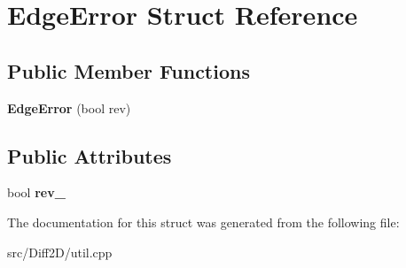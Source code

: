 \hypertarget{structEdgeError}{\section{Edge\-Error Struct Reference}
\label{structEdgeError}
}
\subsection*{Public Member Functions}
\begin{DoxyCompactItemize}
\item 
\hypertarget{structEdgeError_a92ca9588f65b2b4d17139ff80eb29ab3}{{\bfseries Edge\-Error} (bool rev)}\label{structEdgeError_a92ca9588f65b2b4d17139ff80eb29ab3}

\end{DoxyCompactItemize}
\subsection*{Public Attributes}
\begin{DoxyCompactItemize}
\item 
\hypertarget{structEdgeError_a704a81b20878f5b534df310ea179ae02}{bool {\bfseries rev\-\_\-}}\label{structEdgeError_a704a81b20878f5b534df310ea179ae02}

\end{DoxyCompactItemize}


The documentation for this struct was generated from the following file\-:\begin{DoxyCompactItemize}
\item 
src/\-Diff2\-D/util.\-cpp\end{DoxyCompactItemize}
